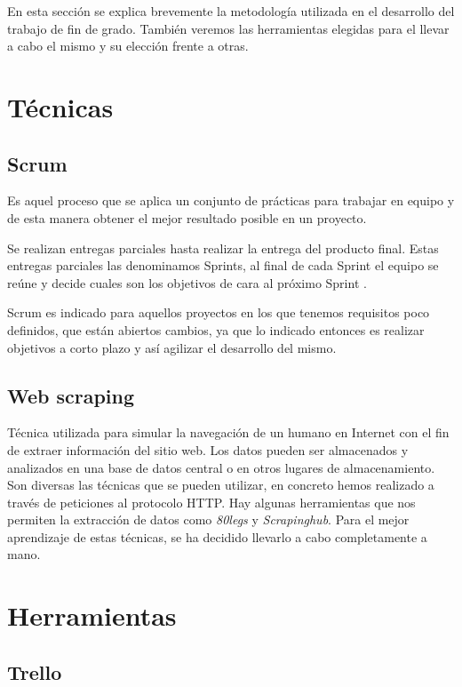 

En esta sección se explica brevemente la metodología utilizada en el desarrollo del trabajo de fin de grado. También veremos las herramientas elegidas para el llevar a cabo el mismo y su elección frente a otras.

\section{Técnicas}

\subsection{Scrum} 
Es aquel proceso que se aplica un conjunto de prácticas para trabajar en equipo y de esta manera obtener el mejor resultado posible en un proyecto.

Se realizan entregas parciales hasta realizar la entrega del producto final. Estas entregas parciales las denominamos Sprints, al final de cada Sprint el equipo se reúne y decide cuales son los objetivos de cara al próximo Sprint \cite{mckenna2016agile}.

Scrum es indicado para aquellos proyectos en los que  tenemos requisitos poco definidos, que están abiertos cambios, ya que lo indicado entonces es realizar objetivos a corto plazo y así  agilizar el desarrollo del mismo.

\subsection{Web scraping}

Técnica utilizada para simular  la navegación de un humano en Internet con el fin de extraer información del sitio web. Los datos pueden ser almacenados y analizados en una base de datos central o en otros lugares de almacenamiento.  Son diversas las técnicas que se pueden utilizar, en concreto hemos realizado a través de peticiones al protocolo HTTP\cite{scraping}. Hay algunas herramientas que nos permiten la extracción de datos como \textit{80legs} y \textit{Scrapinghub}. Para el mejor aprendizaje de estas técnicas, se ha decidido llevarlo a cabo completamente a mano.

\section{Herramientas}

\subsection{Trello}

